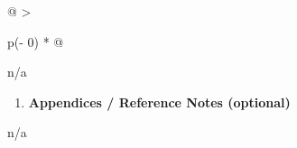 \begin{longtable}[]{@{}
  >{\raggedright\arraybackslash}p{(\columnwidth - 0\tabcolsep) * }@{}}
\begin{minipage}[t]{\linewidth}
n/a

\begin{enumerate}
\def\labelenumi{\arabic{enumi}.}
\setcounter{enumi}{6}
\item
  \textbf{Appendices / Reference Notes (optional)}
\end{enumerate}

n/a
\end{minipage} \\
\end{longtable}